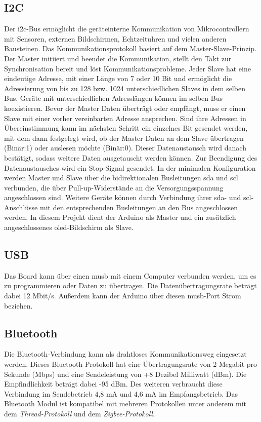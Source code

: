\subsection{I2C}
Der \ac{i2c}-Bus ermöglicht die geräteinterne Kommunikation von Mikrocontrollern mit Sensoren, externen Bildschirmen, Echtzeituhren und vielen anderen Bausteinen. Das Kommunikationsprotokoll basiert auf dem Master-Slave-Prinzip. Der Master initiiert und beendet die Kommunikation, stellt den Takt zur Synchronisation bereit und löst Kommunikationsprobleme. Jeder Slave hat eine eindeutige Adresse, mit einer Länge von 7 oder 10 Bit und ermöglicht die Adressierung von bis zu 128 bzw. 1024 unterschiedlichen Slaves in dem selben Bus. Geräte mit unterschiedlichen Adresslängen können im selben Bus koexistieren. Bevor der Master Daten überträgt oder empfängt, muss er einen Slave mit einer vorher vereinbarten Adresse ansprechen.\cite{Meroth.2021}\cite{STM1.2015}\cite{Bernstein.2020} Sind ihre Adressen in Übereinstimmung kann im nächsten Schritt ein einzelnes Bit gesendet werden, mit dem dann festgelegt wird, ob der Master Daten an dem Slave übertragen (Binär:1) oder auslesen möchte (Binär:0). Dieser Datenaustausch wird danach bestätigt, sodass weitere Daten ausgetauscht werden können. Zur Beendigung des Datenaustausches wird ein Stop-Signal gesendet.\cite{Gehrke.2022} In der minimalen Konfiguration werden Master und Slave über die bidirektionalen Busleitungen \ac{sda} und \ac{scl} verbunden, die über Pull-up-Widerstände an die Versorgungsspannung angeschlossen sind. Weitere Geräte können durch Verbindung ihrer \ac{sda}- und \ac{scl}-Anschlüsse mit den entsprechenden Busleitungen an den Bus angeschlossen werden.\cite{Meroth.2021} In diesem Projekt dient der Arduino als Master und ein zusätzlich angeschlossenes \ac{oled}-Bildschirm als Slave.

\subsection{USB}
Das Board kann über einen \ac{musb} mit einem Computer verbunden werden, um es zu programmieren oder Daten zu übertragen. Die Datenübertragungsrate beträgt dabei 12 Mbit/s. Außerdem kann der Arduino über diesen \ac{musb}-Port Strom beziehen.

\subsection{Bluetooth}
Die Bluetooth-Verbindung kann als drahtloses Kommunikationsweg eingesetzt werden. Dieses Bluetooth-Protokoll hat eine Übertragungsrate von 2 Megabit pro Sekunde (Mbps) und eine Sendeleistung von +8 Dezibel Milliwatt (dBm). Die Empfindlichkeit beträgt dabei -95 dBm. Des weiteren verbraucht diese Verbindung im Sendebetrieb 4,8 mA und 4,6 mA im Empfangsbetrieb. Das Bluetooth Modul ist kompatibel mit mehreren Protokollen unter anderem mit dem \textit{Thread-Protokoll} und dem \textit{Zigbee-Protokoll}.\cite{Ard.2024} \cite{NrdSem4.2024}

